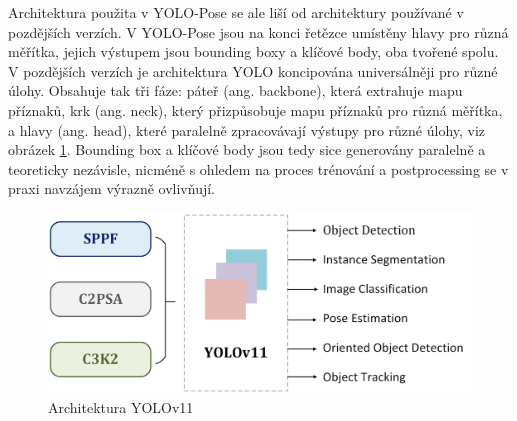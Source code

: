 Architektura použita v YOLO-Pose se ale liší od architektury používané v
pozdějších verzích. V YOLO-Pose jsou na konci řetězce umístěny hlavy pro různá
měřítka, jejich výstupem jsou bounding boxy a klíčové body, oba tvořené spolu.
V pozdějších verzích je architektura YOLO koncipována universálněji pro různé
úlohy. Obsahuje tak tři fáze: páteř (ang. backbone), která extrahuje mapu
příznaků, krk (ang. neck), který přizpůsobuje mapu příznaků pro různá měřítka,
a hlavy (ang. head), které paralelně zpracovávají výstupy pro různé úlohy, viz obrázek \ref{fig:yolov11}. 
\cite{yolov11} Bounding box a klíčové body jsou tedy sice generovány paralelně
a teoreticky nezávisle, nicméně s ohledem na proces trénování a postprocessing
se v praxi navzájem výrazně ovlivňují.


\begin{figure}[]
    \centering
    \centering
    \includegraphics[height=0.2\textheight]{Figures/yolo_v11.png}
    \caption{Architektura YOLOv11 \cite{yolov11}}
    \label{fig:yolov11}
\end{figure}


\endinput